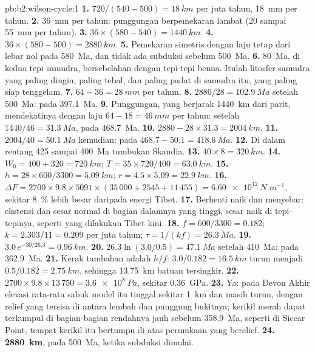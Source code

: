 \begin{solution}{pb:b2:wilson-cycle:1}
\textbf{1.} $720/(540 - 500) = \qty{18}{km}$ per juta tahun, \qty{18}{mm} per tahun.
\textbf{2.} \qty{36}{mm} per tahun: punggungan berpemekaran lambat (20 sampai \qty{55}{mm} per tahun).
\textbf{3.} $36\times(580 - 540) = \qty{1440}{km}$.
\textbf{4.} $36\times(580 - 500) = \qty{2880}{km}$.
\textbf{5.} Pemekaran simetris dengan laju tetap dari lebar nol pada \qty{580}{Ma}, dan tidak ada
subduksi sebelum \qty{500}{Ma}.
\textbf{6.} \qty{80}{Ma}, di kedua tepi samudra, bersebelahan dengan tepi-tepi benua. Itulah litosfer
samudra yang paling dingin, paling tebal, dan paling padat di samudra itu, yang paling siap tenggelam.
\textbf{7.} $64 - 36 = \qty{28}{mm}$ per tahun.
\textbf{8.} $2880/28 = \qty{102.9}{Ma}$ setelah \qty{500}{Ma}: pada \qty{397.1}{Ma}.
\textbf{9.} Punggungan, yang berjarak \qty{1440}{km} dari parit, mendekatinya dengan laju $64 - 18 =
\qty{46}{mm}$ per tahun: setelah $1440/46 = \qty{31.3}{Ma}$, pada \qty{468.7}{Ma}.
\textbf{10.} $2880 - 28\times31.3 = \qty{2004}{km}$.
\textbf{11.} $2004/40 = \qty{50.1}{Ma}$ kemudian: pada $468.7 - 50.1 = \qty{418.6}{Ma}$.
\textbf{12.} Di dalam rentang 425 sampai \qty{400}{Ma} tumbukan Skandia.
\textbf{13.} $40\times8 = \qty{320}{km}$.
\textbf{14.} $W_0 = 400 + 320 = \qty{720}{km}$; $T = 35\times720/400 = \qty{63.0}{km}$.
\textbf{15.} $h = 28\times600/3300 = \qty{5.09}{km}$; $r = 4.5\times5.09 = \qty{22.9}{km}$.
\textbf{16.} $\Delta F = 2700\times9.8\times5091\times(35\,000 + 2545 + 11\,455) =
\qty{6.60e12}{N.m^{-1}}$, sekitar \qty{8}{\percent} lebih besar daripada energi Tibet.
\textbf{17.} Berhenti naik dan menyebar: ekstensi dan sesar normal di bagian dalamnya yang tinggi,
sesar naik di tepi-tepinya, seperti yang dilakukan Tibet kini.
\textbf{18.} $f = 600/3300 = 0.182$; $k = 2.303/11 = 0.209$ per juta tahun; $\tau = 1/(kf)
= \qty{26.3}{Ma}$.
\textbf{19.} $3.0\,e^{-30/26.3} = \qty{0.96}{km}$.
\textbf{20.} $26.3\ln(3.0/0.5) = \qty{47.1}{Ma}$ setelah \qty{410}{Ma}: pada \qty{362.9}{Ma}.
\textbf{21.} Kerak tambahan adalah $h/f$: $3.0/0.182 = \qty{16.5}{km}$ turun menjadi $0.5/0.182 =
\qty{2.75}{km}$, sehingga \qty{13.75}{km} batuan tersingkir.
\textbf{22.} $2700\times9.8\times13\,750 = \qty{3.6e8}{Pa}$, sekitar \qty{0.36}{GPa}.
\textbf{23.} Ya: pada Devon Akhir elevasi rata-rata sabuk model itu tinggal sekitar \qty{1}{km}
dan masih turun, dengan relief yang tersisa di antara lembah dan punggung bukitnya; kerikil merah dapat
terkumpul di bagian-bagian rendahnya jauh sebelum \qty{358.9}{Ma}, seperti di Siccar Point, tempat kerikil itu bertumpu di atas permukaan
yang berelief.
\textbf{24.} \textbf{\qty[text-series-to-math=true]{2880}{km}}, pada \qty{500}{Ma}, ketika
subduksi dimulai.
\end{solution}
